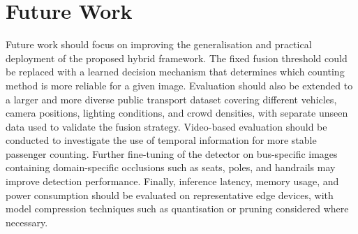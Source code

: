 \section{Future Work}
\label{sec:conclusion_future_work}

Future work should focus on improving the generalisation and practical deployment of the proposed hybrid framework. The fixed fusion threshold could be replaced with a learned decision mechanism that determines which counting method is more reliable for a given image. Evaluation should also be extended to a larger and more diverse public transport dataset covering different vehicles, camera positions, lighting conditions, and crowd densities, with separate unseen data used to validate the fusion strategy. Video-based evaluation should be conducted to investigate the use of temporal information for more stable passenger counting. Further fine-tuning of the detector on bus-specific images containing domain-specific occlusions such as seats, poles, and handrails may improve detection performance. Finally, inference latency, memory usage, and power consumption should be evaluated on representative edge devices, with model compression techniques such as quantisation or pruning considered where necessary.